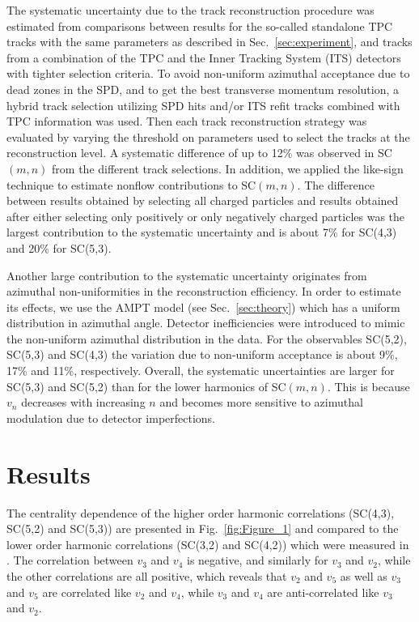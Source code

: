 The systematic uncertainty due to the track reconstruction procedure was estimated from comparisons between results for the so-called standalone TPC tracks with the 
same parameters as described in Sec.~\ref{sec:experiment}, and tracks from a combination of the TPC and the Inner Tracking System (ITS) detectors with tighter selection criteria.
To avoid non-uniform azimuthal acceptance due to dead zones in the SPD, and to get the best transverse momentum resolution, a hybrid track selection utilizing SPD hits and/or ITS refit tracks combined with TPC information was used.
Then each track reconstruction strategy was evaluated by varying the threshold on parameters used to select the tracks at the reconstruction level. 
A systematic difference of up to 12\% was observed in SC$(m,n)$ from the different track selections. 
In addition, we applied the like-sign technique to estimate nonflow contributions to SC$(m,n)$. The difference between results obtained by selecting all charged particles and results obtained after either selecting only positively or only negatively charged particles was the largest contribution to the systematic uncertainty and is about 7\% for SC(4,3) and 20\% for SC(5,3). 

Another large contribution to the systematic uncertainty originates from azimuthal non-uniformities in the reconstruction efficiency. In order to estimate its effects, we use the AMPT model (see Sec.~\ref{sec:theory}) which has a uniform distribution in azimuthal angle.
Detector inefficiencies were introduced to mimic the non-uniform azimuthal distribution in the data. For the observables SC(5,2), SC(5,3) and SC(4,3) the variation due to non-uniform acceptance is about 9\%, 17\% and 11\%, respectively.
Overall, the systematic uncertainties are larger for SC(5,3) and SC(5,2) than for the lower harmonics of SC$(m,n)$.
This is because $v_{n}$ decreases with increasing $n$ and becomes more sensitive to azimuthal modulation due to detector imperfections. 

\section{Results}
\label{sec:results}
The centrality dependence of the higher order harmonic correlations (SC(4,3), SC(5,2) and SC(5,3)) are presented in Fig.~\ref{fig:Figure_1} and compared to the lower order harmonic correlations (SC(3,2) and SC(4,2)) which were measured in \cite{ALICE:2016kpq}. The correlation between $v_3$ and $v_4$ is negative, and similarly for $v_3$ and $v_2$, while the other correlations are all positive, which reveals that $v_2$ and $v_5$ as well as $v_3$ and $v_5$ are correlated like $v_2$ and $v_4$, while $v_3$ and $v_4$ are anti-correlated like $v_3$ and $v_2$.


